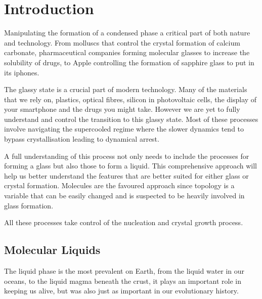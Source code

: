 
\chapter{Introduction}





Manipulating the formation of a condensed phase a critical part of both nature and technology. From molluscs that control the crystal formation of calcium carbonate, pharmaceutical companies forming molecular glasses to increase the solubility of drugs, to Apple controlling the formation of sapphire glass to put in its iphones.

The glassy state is a crucial part of modern technology. Many of the materials that we rely on, plastics, optical fibres, silicon in photovoltaic cells, the display of your smartphone and the drugs you might take. However we are yet to fully understand and control the transition to this glassy state. Most of these processes involve navigating the supercooled regime where the slower dynamics tend to bypass crystallisation leading to dynamical arrest.

A full understanding of this process not only needs to include the processes for forming a glass but also those to form a liquid. This comprehensive approach will help us better understand the features that are better suited for either glass or crystal formation. Molecules are the favoured approach since topology is a variable that can be easily changed and is suspected to be heavily involved in glass formation.



All these processes take control of the nucleation and crystal growth process.

\begin{figure}
    \caption{}
    \label{fig:}
\end{figure}

\section{Molecular Liquids}
The liquid phase is the most prevalent on Earth, from the liquid water in our oceans, to the liquid magma beneath the crust, it plays an important role in keeping us alive, but was also just as important in our evolutionary history.

